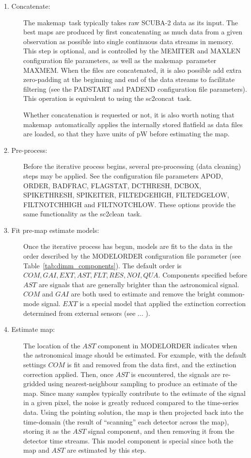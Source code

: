 \documentclass[twoside,11pt]{article}
\newcommand{\xref}[3]{#1}
\renewcommand{\_}{\texttt{\symbol{95}}}
\newcommand{\task}[1]{\textsf{#1}}
\newcommand{\makemap}{\xref{\task{makemap}}{sun258}{MAKEMAP}}
\newcommand{\clean}{\xref{\task{sc2clean}}{sun258}{SC2CLEAN}}
\newcommand{\concat}{\xref{\task{sc2concat}}{sun258}{SC2CONCAT}}
\begin{document}
\begin{description}

\item[1. Concatenate:] The \makemap\ task typically takes raw SCUBA-2
  data as its input. The best maps are produced by first concatenating
  as much data from a given observation as possible into single
  continuous data streams in memory. This step is optional, and is
  controlled by the MEMITER and MAXLEN configuration file parameters,
  as well as the \makemap\ parameter MAXMEM. When the files are
  concatenated, it is also possible add extra zero-padding at the
  beginning and end of the data streams to facilitate filtering (see
  the PADSTART and PADEND configuration file parameters). This
  operation is equivalent to using the \concat\ task.

  Whether concatenation is requested or not, it is also worth noting
  that \makemap\ automatically applies the internally stored flatfield
  as data files are loaded, so that they have units of pW before
  estimating the map.

\item[2. Pre-process:] Before the iterative process begins, several
  pre-processing (data cleaning) steps may be applied. See the
  configuration file parameters APOD, ORDER, BADFRAC, FLAGSTAT,
  DCTHRESH, DCBOX, SPIKETHRESH, SPIKEITER, FILT\_EDGEHIGH,
  FILT\_EDGELOW, FILT\_NOTCHHIGH and FILT\_NOTCHLOW. These options
  provide the same functionality as the \clean\ task.

\item[3. Fit pre-map estimate models:] Once the iterative process has
  begun, models are fit to the data in the order described by the
  MODELORDER configuration file parameter (see
  Table~\ref{tab:dimm_components}). The default order is $COM, GAI,
  EXT, AST, FLT, RES, NOI, QUA$. Components specified before $AST$ are
  signals that are generally brighter than the astronomical
  signal. $COM$ and $GAI$ are both used to estimate and remove the
  bright common-mode signal. $EXT$ is a special model that applied the
  extinction correction determined from external sensors (see ... ).

\item[4. Estimate map:] The location of the $AST$ component in
  MODELORDER indicates when the astronomical image should be
  estimated. For example, with the default settings $COM$ is fit and
  removed from the data first, and the extinction correction
  applied. Then, once $AST$ is encountered, the signals are re-gridded
  using nearest-neighbour sampling to produce an estimate of the
  map. Since many samples typically contribute to the estimate of the
  signal in a given pixel, the noise is greatly reduced compared to
  the time-series data. Using the pointing solution, the map is then
  projected back into the time-domain (the result of ``scanning'' each
  detector across the map), storing it as the $AST$ signal component,
  and then removing it from the detector time streams. This model
  component is special since both the map and $AST$ are estimated by
  this step.


\end{description}
\end{document}
